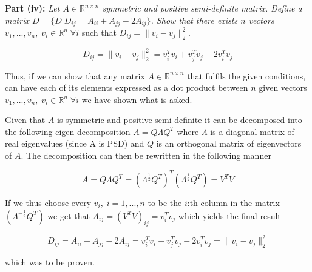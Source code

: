 \textbf{Part (iv):} \textit{Let $A \in \mathbb{R}^{n \times n}$ symmetric and positive semi-definite matrix. Define a matrix $D = \{ D | D_{ij} = A_{ii} + A_{jj} - 2A_{ij} \}$. Show that there exists $n$ vectors $v_1, ..., v_n, \; v_i \in \mathbb{R}^n \; \forall i$} such that $D_{ij} = \lVert v_i - v_j \rVert^2_2$.

\begin{equation}
  D_{ij} = \lVert v_i - v_j \rVert^2_2 = v_i^T v_i + v_j^T v_j - 2v_i^T v_j
\end{equation}

Thus, if we can show that any matrix $A \in \mathbb{R}^{n \times n}$ that fulfils the given conditions, can have each of its elements expressed as a dot product between $n$ given vectors $v_1, ..., v_n, \; v_i \in \mathbb{R}^n \; \forall i$ we have shown what is asked.

Given that $A$ is symmetric and positive semi-definite it can be decomposed into the following eigen-decomposition $A = Q \Lambda Q^T$ where $\Lambda$ is a diagonal matrix of real eigenvalues (since A is PSD) and $Q$ is an orthogonal matrix of eigenvectors of $A$. The decomposition can then be rewritten in the following manner

\begin{equation}
  A = Q \Lambda Q^T = (\Lambda^{\frac{1}{2}} Q^T)^T (\Lambda^{\frac{1}{2}} Q^T) = V^T V
\end{equation}

If we thus choose every $v_i, \; i = 1 ,..., n$ to be the $i$:th column in the matrix $(\Lambda^{-\frac{1}{2}} Q^T)$ we get that $A_{ij} = (V^T V)_{ij} = v_i^T v_j$ which yields the final result

\begin{equation}
  D_{ij} = A_{ii} + A_{jj} - 2A_{ij} = v_i^T v_i + v_j^T v_j - 2v_i^T v_j = \lVert v_i - v_j \rVert^2_2
\end{equation}

which was to be proven.
